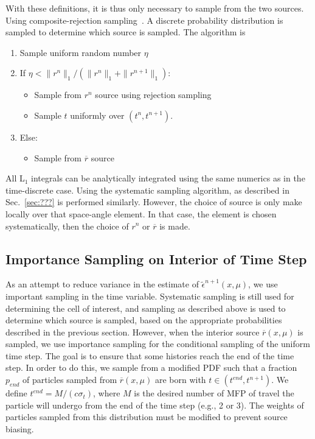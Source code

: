 With these definitions, it is thus only necessary to sample from the two sources.  Using
composite-rejection sampling~\cite{shultis_mc}.  A discrete probability distribution is
sampled to determine which source is sampled.  The algorithm is
\begin{enumerate}
    \item Sample uniform random number $\eta$
    \item If $\eta < \|r^{n}\|_1/(\|r^{n}\|_1 + \|r^{n+1}\|_1)$:
    \begin{itemize}
        \item Sample from $r^{n}$ source using rejection sampling
        \item Sample $t$ uniformly over $(t^{n},t^{n+1})$.
    \end{itemize}
\item Else:
    \begin{itemize}
        \item Sample from $\overline r$ source
    \end{itemize}
\end{enumerate}
All L$_1$ integrals can be analytically integrated using the same numerics as in the
time-discrete case.  Using the systematic sampling algorithm, as described in
Sec.~\ref{sec:???} is performed similarly.  However, the choice of source is only make
locally over that space-angle element. In that case, the element is chosen systematically,
then the choice of $r^{n}$ or $\overline r$ is made.

\subsection{Importance Sampling on Interior of Time Step}

As an attempt to reduce variance in the estimate of $\tilde \epsilon^{n+1}(x,\mu)$, we use
important sampling in the time variable.  Systematic sampling is still used for
determining the cell of interest, and sampling as described above is used to determine
which source is sampled, based on the appropriate probabilities described in the previous
section.  However, when the interior source $\overline r(x,\mu)$ is sampled, we use
importance sampling for the conditional sampling of the uniform time step.  The goal is to ensure that some
histories reach the end of the time step.  In order to do this, we sample from a modified
PDF such that a fraction $p_{end}$ of particles sampled from $\overline r(x,\mu)$ are born
with $t\in(t^{end},t^{n+1})$.  We define $t^{end}=M/(c\sigma_t)$, where $M$ is the desired
number of MFP of travel the particle will undergo from the end of
the time step (e.g., 2 or 3).  The weights of particles sampled from this
distribution must be modified to prevent source biasing.

